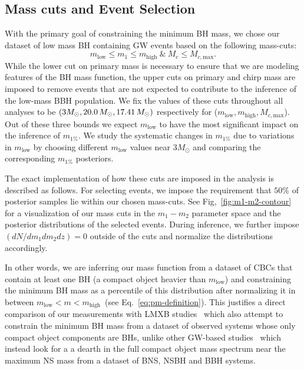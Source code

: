 \documentclass[modern]{aastex631}
\begin{document}
\subsection{Mass cuts and Event Selection}
With the primary goal of constraining the minimum BH mass, we chose our dataset of low mass BH containing GW events based on the following mass-cuts:
\begin{equation}
   m_\mathrm{low}\leq m_1 \leq m_\mathrm{high} ~\&~M_c\leq M_{c,\mathrm{max}}.
\end{equation}
While the lower cut on primary mass is necessary to ensure that we are modeling features of the BH mass function, the upper cuts on primary and chirp mass are imposed to remove events that are not expected to contribute to the inference of the low-mass BBH population. We fix the values of these cuts throughout all analyses to be $(3M_{\odot}, 20.0 \, M_\odot, 17.41 \, M_\odot)$ respectively for ($m_\mathrm{low}, m_\mathrm{high}, M_{c,\mathrm{max}}$). Out of these three bounds we expect $m_\mathrm{low}$ to have the most significant impact on the inference of $m_{1\%}$. We study the systematic changes in $m_{1\%}$ due to variations in $m_\mathrm{low}$ by choosing different $m_\mathrm{low}$ values near $3M_{\odot}$ and comparing the corresponding $m_{1\%}$ posteriors.

The exact implementation of how these cuts are imposed in the analysis is described as follows. For selecting events, we impose the requirement that $50\%$ of posterior samples lie within our chosen mass-cuts. See Fig,~\ref{fig:m1-m2-contour} for a visualization of our mass cuts in the $m_1-m_2$ parameter space and the posterior distributions of the selected events. During inference, we further impose $(dN/dm_1dm_2dz)=0$ outside of the cuts and normalize the distributions accordingly. 

In other words, we are inferring our mass function from a dataset of CBCs that contain at least one BH (a compact object heavier than $m_\mathrm{low}$) and constraining the minimum BH mass as a percentile of this distribution after normalizing it in between $m_\mathrm{low}<m<m_\mathrm{high}$~(see Eq.~\eqref{eq:pm-definition}). This justifies a direct comparison of our measurements with LMXB studies~\citep{Bailyn:1997xt, Farr:2010tu, Ozel:2010su} which also attempt to constrain the minimum BH mass from a dataset of observed systems whose only compact object components are BHs, unlike other GW-based studies~\citep{Farah:2021qom} which instead look for a a dearth in the full compact object mass spectrum near the maximum NS mass from a dataset of BNS, NSBH and BBH systems.
\end{document}
